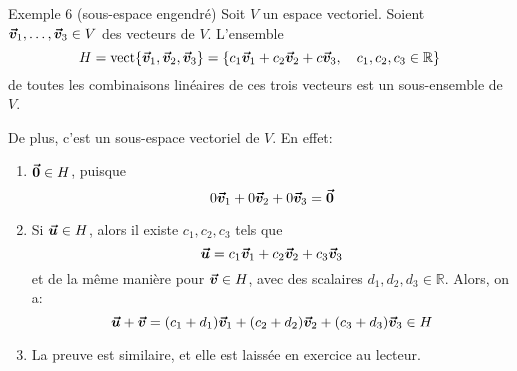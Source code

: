 \documentclass[a4paper]{article}
\begin{document}
\begin{parag}{Exemple 6 (sous-espace engendré)}
    Soit $V$ un espace vectoriel. Soient $\bm{\protect\vec{v}}_1, \ldots, \bm{\protect\vec{v}}_3 \in V$ des vecteurs de $V$. L'ensemble
    \[H = \vect\left\{\bvec{v}_1, \bvec{v}_2, \bvec{v}_3\right\} = \left\{c_1 \bvec{v}_1 + c_2 \bvec{v}_2 + c\bvec{v}_3, \mathspace c_1, c_2, c_3 \in \mathbb{R}\right\}\]
    de toutes les combinaisons linéaires de ces trois vecteurs est un sous-ensemble de $V$.

    De plus, c'est un sous-espace vectoriel de $V$. En effet:
    \begin{enumerate}
        \item $\bm{\protect\vec{0}} \in H$, puisque
        \[0 \bm{\protect\vec{v}}_1 + 0 \bm{\protect\vec{v}}_2 + 0 \bm{\protect\vec{v}}_3 = \bm{\protect\vec{0}}\]
        \item Si $\bm{\protect\vec{u}} \in H$, alors il existe $c_1, c_2, c_3$ tels que
        \[\bm{\protect\vec{u}} = c_1 \bm{\protect\vec{v}}_1 + c_2 \bm{\protect\vec{v}}_2 + c_3 \bm{\protect\vec{v}}_3\]
        et de la même manière pour $\bm{\protect\vec{v}} \in H$, avec des scalaires $d_1, d_2, d_3 \in \mathbb{R}$. Alors, on a:
        \[\bvec{u} + \bvec{v} = \left(c_1 + d_1\right) \bvec{v}_1 + \left(c_2 + d_2\right)\bvec{v}_2 + \left(c_3 + d_3\right) \bvec{v}_3 \in H\]

        \item La preuve est similaire, et elle est laissée en exercice au lecteur.
    \end{enumerate}

\end{parag}
\end{document}
